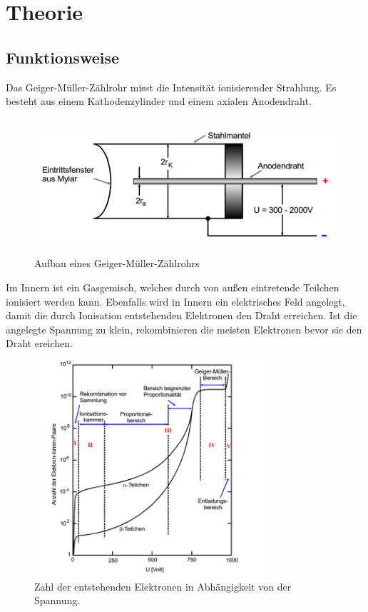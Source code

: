 \section{Theorie}
\label{sec:Theorie}

\cite{sample}

\subsection{Funktionsweise}
Das Geiger-Müller-Zählrohr misst die Intensität ionisierender Strahlung. Es besteht aus einem Kathodenzylinder und einem axialen
Anodendraht.

\begin{figure}[H]
  \centering
  \includegraphics[height=5cm]{geigerzaehler.PNG}
  \caption{Aufbau eines Geiger-Müller-Zählrohrs \cite{sample}}
  \label{fig:Linienspektrum}
\end{figure}

 Im Innern ist ein Gasgemisch, welches durch von außen eintretende Teilchen ionisiert werden kann. Ebenfalls wird in Innern ein elektrisches
 Feld angelegt, damit die durch Ionisation entstehenden Elektronen den Draht erreichen. Ist die angelegte Spannung zu klein,
 rekombinieren die meisten Elektronen bevor sie den Draht ereichen.

 \begin{figure}[H]
   \centering
   \includegraphics[height=8cm]{zonen.PNG}
   \caption{Zahl der entstehenden Elektronen in Abhängigkeit von der Spannung. \cite{sample}}
   \label{fig:Linienspektrum}
 \end{figure}


